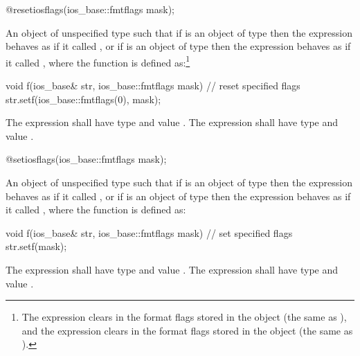 %
\begin{itemdecl}
@\unspec@ resetiosflags(ios_base::fmtflags mask);
\end{itemdecl}

\begin{itemdescr}
\pnum
\returns An object of
unspecified type such that if  is an object of type
 then the expression
 behaves as if it called
, or if  is an object of type
 then the expression
 behaves as if it called
, where the function 
is defined as:\footnote{ The expression 
clears  in the format flags stored in the
 object  (the same as
), and the expression
 clears  in the
format flags stored in the  object
 (the same as ). }

\begin{codeblock}
void f(ios_base& str, ios_base::fmtflags mask) {
  // reset specified flags
  str.setf(ios_base::fmtflags(0), mask);
}
\end{codeblock}

The expression  shall have
type  and value . The
expression  shall have type
 and value . \end{itemdescr}

%
\begin{itemdecl}
@\unspec@ setiosflags(ios_base::fmtflags mask);
\end{itemdecl}

\begin{itemdescr}
\pnum
\returns
An object of unspecified type such that if
is an object of type
then the expression
behaves as if it called
,
or if
is an object of type
then the expression
behaves as if it called
, where the function  is defined as:
%

\begin{codeblock}
void f(ios_base& str, ios_base::fmtflags mask) {
  // set specified flags
  str.setf(mask);
}
\end{codeblock}

The expression
shall have type
and value
.
The expression
shall have type
and value
.
\end{itemdescr}

